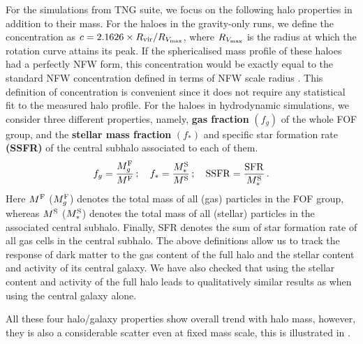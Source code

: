 For the simulations from TNG suite, we focus on the following halo properties in addition to their mass. For the haloes in the gravity-only runs, we define the concentration as $c=2.1626 \times R_{\rm vir}/R_{V_{\rm{max}}}$, where $R_{V_{\rm{max}}}$ is the radius at which the rotation curve attains its peak. If the sphericalised mass profile of these haloes had a perfectly NFW form, this concentration would be exactly equal to the standard NFW concentration defined in terms of NFW scale radius \citep[see equation 5 of ][]{1996ApJ...462..563N}. 
This definition of concentration is convenient since it does not require any statistical fit to the measured halo profile.
For the haloes in hydrodynamic simulations, we consider 
three different properties, namely, \textbf{gas fraction} $(f_g)$ of the whole FOF group, and the \textbf{stellar mass fraction} $(f_{\ast})$ and specific star formation rate \textbf{(SSFR)} of the central subhalo associated to each of them. 
\begin{align}
    f_{g} = \frac{M_{g}^{\rm{F}}}{M^{\rm{F}}}\,; \quad
    f_{\ast} = \frac{M_{\ast}^{\rm{S}}}{M^{\rm{S}}}\,; \quad {\rm SSFR} = \frac{\rm{SFR}}{M_{\ast}^{\rm{S}}}\,.
\label{eq:galpropdefs-ch:z0main}
\end{align}
Here $M^{\rm{F}}$ ($M_{g}^{\rm{F}}$) denotes the total mass of all (gas) particles in the FOF group, whereas $M^{\rm{S}}$ ($M_{\ast}^{\rm{S}}$) denotes the total mass of all (stellar) particles in the associated central subhalo. 
Finally, SFR denotes the sum of star formation rate of all gas cells in the central subhalo. The above definitions allow us to track the response of dark matter to the gas content of the full halo and the stellar content and activity of its central galaxy. We have also checked that using the stellar content and activity of the full halo leads to qualitatively similar results as when using the central galaxy alone.

All these four halo/galaxy properties show overall trend with halo mass, however, they is also a considerable scatter even at fixed mass scale, this is illustrated in . 

